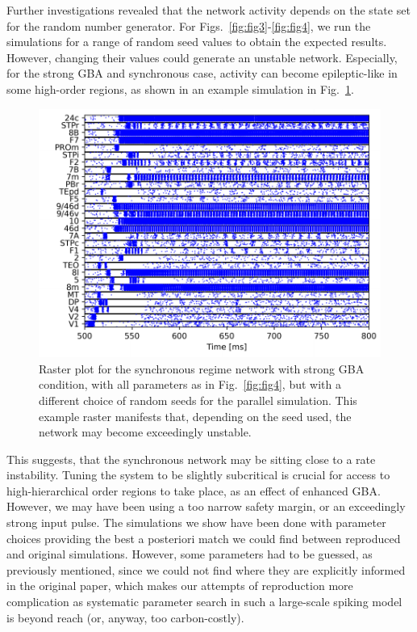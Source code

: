 Further investigations revealed that the network activity depends on the state set for the random number generator. For Figs.~\ref{fig:fig3}-\ref{fig:fig4}, we run the simulations for a range of random seed values to obtain the expected results. However, changing their values could generate an unstable network. Especially, for the strong GBA and synchronous case, activity can become epileptic-like in some high-order regions, as shown in an example simulation in Fig.~\ref{fig:fig5}. 

\begin{figure}[!ht]
 \centering
     \includegraphics[scale=0.6]{figures/fig7.pdf}
 \caption{Raster plot for the synchronous regime network with strong GBA condition, with all parameters as in Fig.~\ref{fig:fig4}, but with a different choice of random seeds for the parallel simulation. This example raster manifests that, depending on the seed used, the network may become exceedingly unstable.}\label{fig:fig5}
\end{figure}

This suggests, that the synchronous network may be sitting close to a rate instability. Tuning the system to be slightly subcritical is crucial for access to high-hierarchical order regions to take place, as an effect of enhanced GBA. However, we may have been using a too narrow safety margin, or an exceedingly strong input pulse. The simulations we show have been done with parameter choices providing the best a posteriori match we could find between reproduced and original simulations. However, some parameters had to be guessed, as previously mentioned, since we could not find where they are explicitly informed in the original paper, which makes our attempts of reproduction more complication as systematic parameter search in such a large-scale spiking model is beyond reach (or, anyway, too carbon-costly).

